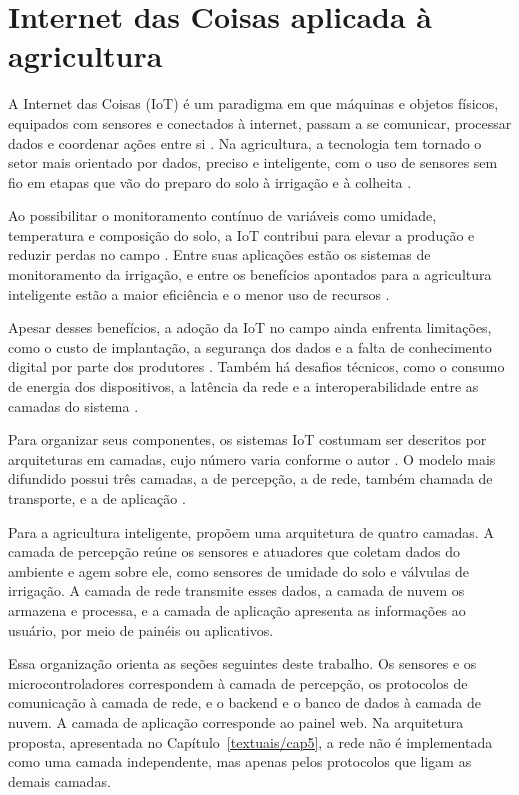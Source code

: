 \section{Internet das Coisas aplicada à agricultura}
\label{sec:iot}

A Internet das Coisas (IoT) é um paradigma em que máquinas e objetos físicos, equipados com sensores e conectados à internet, passam a se comunicar, processar dados e coordenar ações entre si \cite{burhan2018}. Na agricultura, a tecnologia tem tornado o setor mais orientado por dados, preciso e inteligente, com o uso de sensores sem fio em etapas que vão do preparo do solo à irrigação e à colheita \cite{ayaz2019}.

Ao possibilitar o monitoramento contínuo de variáveis como umidade, temperatura e composição do solo, a IoT contribui para elevar a produção e reduzir perdas no campo \cite{rajak2023}. Entre suas aplicações estão os sistemas de monitoramento da irrigação, e entre os benefícios apontados para a agricultura inteligente estão a maior eficiência e o menor uso de recursos \cite{morchid2024}.

Apesar desses benefícios, a adoção da IoT no campo ainda enfrenta limitações, como o custo de implantação, a segurança dos dados e a falta de conhecimento digital por parte dos produtores \cite{rajak2023}. Também há desafios técnicos, como o consumo de energia dos dispositivos, a latência da rede e a interoperabilidade entre as camadas do sistema \cite{villahenriksen2020}.

Para organizar seus componentes, os sistemas IoT costumam ser descritos por arquiteturas em camadas, cujo número varia conforme o autor \cite{burhan2018}. O modelo mais difundido possui três camadas, a de percepção, a de rede, também chamada de transporte, e a de aplicação \cite{burhan2018,tewari2020}.

Para a agricultura inteligente,  propõem uma arquitetura de quatro camadas. A camada de percepção reúne os sensores e atuadores que coletam dados do ambiente e agem sobre ele, como sensores de umidade do solo e válvulas de irrigação. A camada de rede transmite esses dados, a camada de nuvem os armazena e processa, e a camada de aplicação apresenta as informações ao usuário, por meio de painéis ou aplicativos.

Essa organização orienta as seções seguintes deste trabalho. Os sensores e os microcontroladores correspondem à camada de percepção, os protocolos de comunicação à camada de rede, e o backend e o banco de dados à camada de nuvem. A camada de aplicação corresponde ao painel web. Na arquitetura proposta, apresentada no Capítulo~\ref{textuais/cap5}, a rede não é implementada como uma camada independente, mas apenas pelos protocolos que ligam as demais camadas.


